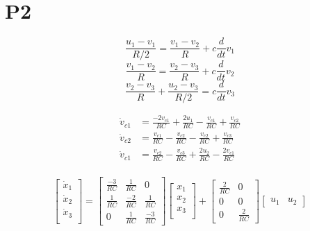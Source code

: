 \documentclass{article}
\begin{document}
\section{P2}
\[
\frac{u_1-v_1}{R/2} = \frac{v_1-v_2}{R} + c\frac{d}{dt}v_1
\]
\[
\frac{v_1-v_2}{R} = \frac{v_2-v_3}{R} + c\frac{d}{dt}v_2
\]
\[
\frac{v_2-v_3}{R} + \frac{u_2-v_3}{R/2} = c\frac{d}{dt}v_3
\]

\begin{align*}
    \dot v_{c1} &= \frac{-2v_{c1}}{RC} + \frac{2u_1}{RC} -\frac{v_{c1}}{RC} + \frac{v_{c2}}{RC} \\
    \dot v_{c2} &= \frac{v_{c1}}{RC} - \frac{v_{c2}}{RC} - \frac{v_{c2}}{RC} + \frac{v_{c3}}{RC} \\
    \dot v_{c1} &= \frac{v_{c2}}{RC} - \frac{v_{c3}}{RC} + \frac{2u_2}{RC} - \frac{2v_{c1}}{RC} \\
\end{align*}

\[
\begin{bmatrix}
    \dot x_1 \\
    \dot x_2 \\
    \dot x_3 \\
\end{bmatrix}
=
\begin{bmatrix}
    \frac{-3}{RC} & \frac{1}{RC} & 0 \\
    \frac{1}{RC} & \frac{-2}{RC} & \frac{1}{RC} \\
    0 & \frac{1}{RC} & \frac{-3}{RC}
\end{bmatrix}
\begin{bmatrix}
    x_1 \\
    x_2 \\
    x_3 \\
\end{bmatrix}
+
\begin{bmatrix}
    \frac{2}{RC} & 0 \\
    0 & 0 \\
    0 & \frac{2}{RC}
\end{bmatrix}
\begin{bmatrix}
    u_1 & u_2
\end{bmatrix}
\]
\end{document}
